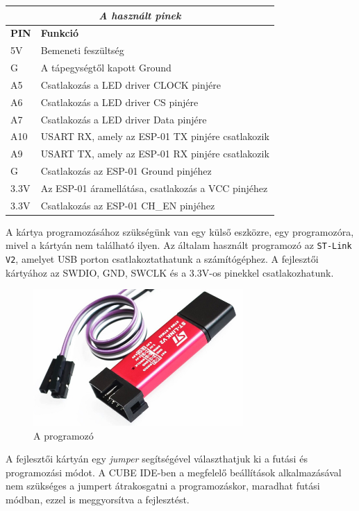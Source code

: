 \documentclass[a4paper, 12pt]{article}
\begin{document}
\begin{center}
\begin{tabular}{ | l | l | }
\hline
\multicolumn{2}{|c|}{\textit{\Large{A használt pinek}}} \\
\hline
\textbf{PIN} & \textbf{Funkció}\\
\hline
5V & Bemeneti feszültség\\
G & A tápegységtől kapott Ground\\
\hline
A5 & Csatlakozás a LED driver CLOCK pinjére\\
A6 & Csatlakozás a LED driver CS pinjére\\
A7 & Csatlakozás a LED driver Data pinjére\\
\hline
A10 & USART RX, amely az ESP-01 TX pinjére csatlakozik\\
A9 & USART TX, amely az ESP-01 RX pinjére csatlakozik\\
G & Csatlakozás az ESP-01 Ground pinjéhez\\
3.3V & Az ESP-01 áramellátása, csatlakozás a VCC pinjéhez\\
3.3V & Csatlakozás az ESP-01 CH\_EN pinjéhez\\
\hline
\end{tabular}
\end{center}

A kártya programozásához szükségünk van egy külső eszközre, egy programozóra, mivel a kártyán nem található ilyen. Az általam használt programozó az \texttt{ST-Link V2}, amelyet USB porton csatlakoztathatunk a számítógéphez. A fejlesztői kártyához az SWDIO, GND, SWCLK és a 3.3V-os pinekkel csatlakozhatunk.

\begin{figure}[ht]
	\centering
	\includegraphics[width = 8cm]{images/stlink.jpg}
	\caption{A programozó}
	\label{fig:stlink}
\end{figure}	

A fejlesztői kártyán egy \textit{jumper} segítségével választhatjuk ki a futási és programozási módot. A CUBE IDE-ben a megfelelő beállítások alkalmazásával nem szükséges a jumpert átrakosgatni a programozáskor, maradhat futási módban, ezzel is meggyorsítva a fejlesztést.
\end{document}
